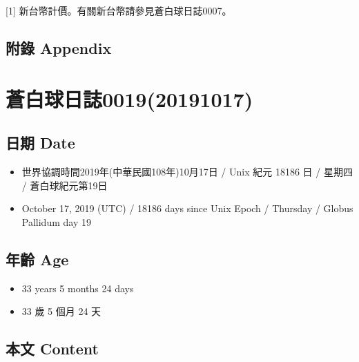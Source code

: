 \documentclass[a5paper, 12pt
]{book}
\providecommand{\tightlist}{%
  \setlength{\itemsep}{0pt}\setlength{\parskip}{0pt}}
\begin{document}
{[}1{]} 新台幣計價。有關新台幣請參見蒼白球日誌0007。

\hypertarget{ux9644ux9304-appendix-10}{%
\subsection{附錄 Appendix}\label{ux9644ux9304-appendix-10}}

\hypertarget{ux84bcux767dux7403ux65e5ux8a8c001920191017}{%
\section{蒼白球日誌0019(20191017)}\label{ux84bcux767dux7403ux65e5ux8a8c001920191017}}

\hypertarget{ux65e5ux671f-date-16}{%
\subsection{日期 Date}\label{ux65e5ux671f-date-16}}

\begin{itemize}
\tightlist
\item
  世界協調時間2019年(中華民國108年)10月17日 / Unix 紀元 18186 日 /
  星期四 / 蒼白球紀元第19日
\item
  October 17, 2019 (UTC) / 18186 days since Unix Epoch / Thursday /
  Globus Pallidum day 19
\end{itemize}

\hypertarget{ux5e74ux9f61-age-16}{%
\subsection{年齡 Age}\label{ux5e74ux9f61-age-16}}

\begin{itemize}
\tightlist
\item
  33 years 5 months 24 days
\item
  33 歲 5 個月 24 天
\end{itemize}

\hypertarget{ux672cux6587-content-16}{%
\subsection{本文 Content}\label{ux672cux6587-content-16}}
\end{document}
